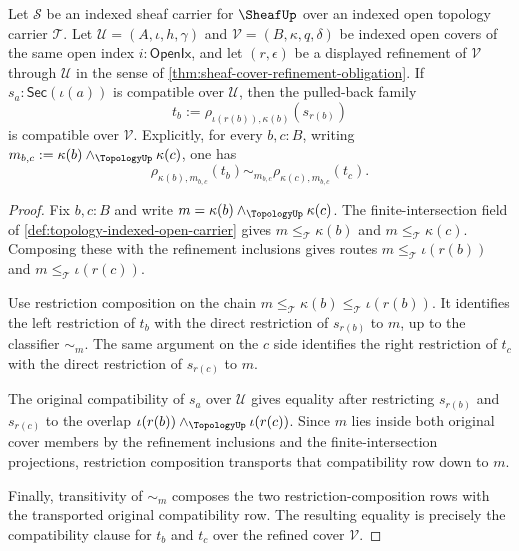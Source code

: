 \begin{theorem}
\label{thm:sheaf-refinement-compatible-family-pullback}
Let $\mathcal{S}$ be an indexed sheaf carrier for $\SheafUp$ over an indexed open topology carrier $\mathcal{T}$. Let $\mathcal{U}=(A,\iota,h,\gamma)$ and $\mathcal{V}=(B,\kappa,q,\delta)$ be indexed open covers of the same open index $i:\mathsf{OpenIx}$, and let $(r,\epsilon)$ be a displayed refinement of $\mathcal{V}$ through $\mathcal{U}$ in the sense of \autoref{thm:sheaf-cover-refinement-obligation}. If $s_a:\mathsf{Sec}(\iota(a))$ is compatible over $\mathcal{U}$, then the pulled-back family
$$
t_b:=\rho_{\iota(r(b)),\kappa(b)}(s_{r(b)})
$$
is compatible over $\mathcal{V}$. Explicitly, for every $b,c:B$, writing $m_{b,c}:=\kappa(b)\wedge_{\TopologyUp}\kappa(c)$, one has
$$
\rho_{\kappa(b),m_{b,c}}(t_b)
\sim_{m_{b,c}}
\rho_{\kappa(c),m_{b,c}}(t_c).
$$
\end{theorem}
\begin{proof}
Fix $b,c:B$ and write $m=\kappa(b)\wedge_{\TopologyUp}\kappa(c)$. The finite-intersection field of \autoref{def:topology-indexed-open-carrier} gives $m\le_{\mathcal{T}}\kappa(b)$ and $m\le_{\mathcal{T}}\kappa(c)$. Composing these with the refinement inclusions gives routes $m\le_{\mathcal{T}}\iota(r(b))$ and $m\le_{\mathcal{T}}\iota(r(c))$.

Use restriction composition on the chain $m\le_{\mathcal{T}}\kappa(b)\le_{\mathcal{T}}\iota(r(b))$. It identifies the left restriction of $t_b$ with the direct restriction of $s_{r(b)}$ to $m$, up to the classifier $\sim_m$. The same argument on the $c$ side identifies the right restriction of $t_c$ with the direct restriction of $s_{r(c)}$ to $m$.

The original compatibility of $s_a$ over $\mathcal{U}$ gives equality after restricting $s_{r(b)}$ and $s_{r(c)}$ to the overlap $\iota(r(b))\wedge_{\TopologyUp}\iota(r(c))$. Since $m$ lies inside both original cover members by the refinement inclusions and the finite-intersection projections, restriction composition transports that compatibility row down to $m$.

Finally, transitivity of $\sim_m$ composes the two restriction-composition rows with the transported original compatibility row. The resulting equality is precisely the compatibility clause for $t_b$ and $t_c$ over the refined cover $\mathcal{V}$.
\end{proof}

